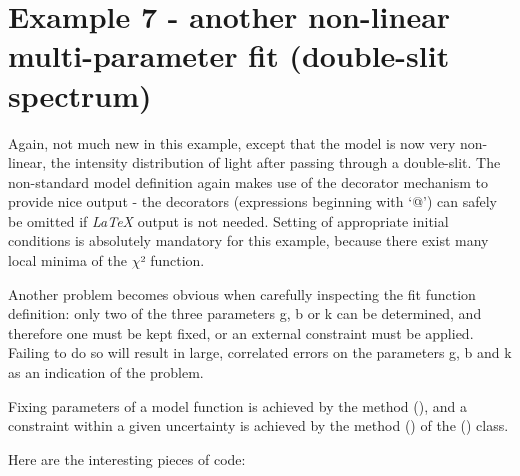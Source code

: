 \documentclass[a4paper,10pt,english]{sphinxmanual}
\begin{document}
\section{Example 7 - another non-linear multi-parameter fit (double-slit spectrum)}
\label{examples:example-7-another-non-linear-multi-parameter-fit-double-slit-spectrum}
Again, not much new in this example, except that the
model is now very non-linear, the intensity distribution
of light after passing through a double-slit. The
non-standard model definition again makes use of the
decorator mechanism to provide nice output - the decorators
(expressions beginning with `@') can safely be omitted if \emph{LaTeX}
output is not needed. Setting of appropriate initial
conditions is absolutely mandatory for this example,
because there  exist many local minima of the \(\chi\)² function.

Another problem becomes obvious when carefully inspecting
the fit function definition: only two of the three parameters g,
b or k can be determined, and therefore one must be kept fixed,
or an external constraint must be applied.
Failing to do so will result in large, correlated errors
on the parameters g, b and k as an indication of the problem.

Fixing parameters of a model function is achieved by the method
{\hyperref[module_doc:kafe.fit.Fit.fix_parameters]{\emph{}}} (), and a constraint within a given uncertainty
is achieved by the method {\hyperref[module_doc:kafe.fit.Fit.constrain_parameters]{\emph{}}} ()
of the {\hyperref[module_doc:kafe.fit.Fit]{\emph{}}} () class.

Here are the interesting pieces of code:
\end{document}

